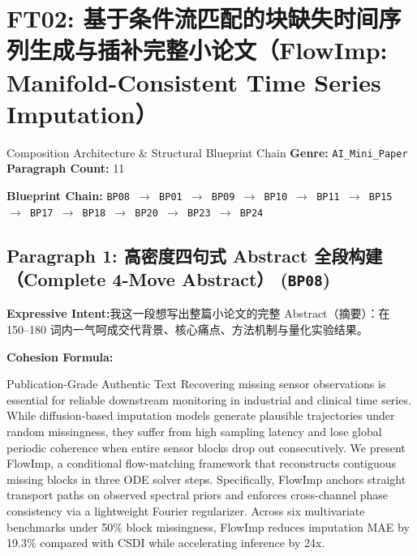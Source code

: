 \section{FT02: 基于条件流匹配的块缺失时间序列生成与插补完整小论文（FlowImp: Manifold-Consistent Time Series Imputation）}\label{comp:FT02}
\begin{ConceptBox}{Composition Architecture \& Structural Blueprint Chain}
\textbf{Genre:} \texttt{AI\_Mini\_Paper} \quad \textbf{Paragraph Count:} 11\par
\textbf{Blueprint Chain:} \texttt{BP08 $\to$ BP01 $\to$ BP09 $\to$ BP10 $\to$ BP11 $\to$ BP15 $\to$ BP17 $\to$ BP18 $\to$ BP20 $\to$ BP23 $\to$ BP24}
\end{ConceptBox}
\subsection*{Paragraph 1: 高密度四句式 Abstract 全段构建（Complete 4-Move Abstract） (\texttt{BP08})}
\noindent\textbf{Expressive Intent:}\enspace 我这一段想写出整篇小论文的完整 Abstract（摘要）：在 150--180 词内一气呵成交代背景、核心痛点、方法机制与量化实验结果。\par
\noindent\textbf{Cohesion Formula:}\par\vspace{4pt}
\begin{ExampleBox}{Publication-Grade Authentic Text}
Recovering missing sensor observations is essential for reliable downstream monitoring in industrial and clinical time series. While diffusion-based imputation models generate plausible trajectories under random missingness, they suffer from high sampling latency and lose global periodic coherence when entire sensor blocks drop out consecutively. We present FlowImp, a conditional flow-matching framework that reconstructs contiguous missing blocks in three ODE solver steps. Specifically, FlowImp anchors straight transport paths on observed spectral priors and enforces cross-channel phase consistency via a lightweight Fourier regularizer. Across six multivariate benchmarks under 50\% block missingness, FlowImp reduces imputation MAE by 19.3\% compared with CSDI while accelerating inference by 24x.
\end{ExampleBox}
